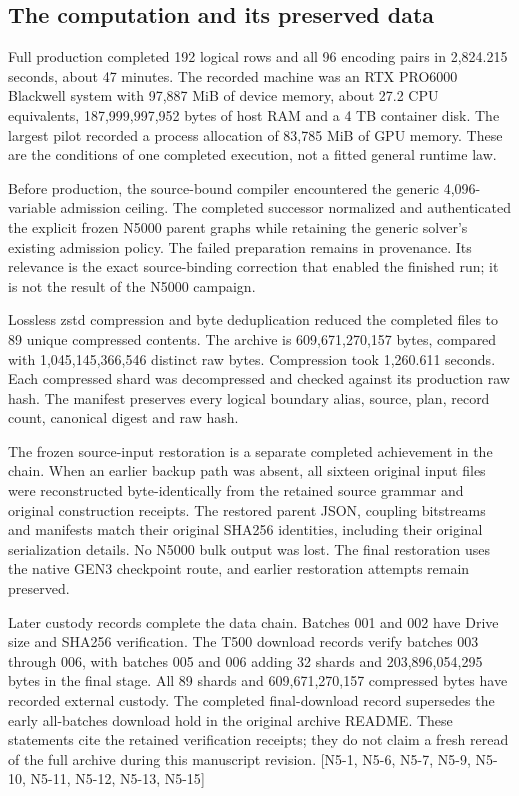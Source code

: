 \subsection{The computation and its preserved data}\label{the-computation-and-its-preserved-data}

Full production completed 192 logical rows and all 96 encoding pairs in 2,824.215 seconds, about 47 minutes. The recorded machine was an RTX PRO6000 Blackwell system with 97,887 MiB of device memory, about 27.2 CPU equivalents, 187,999,997,952 bytes of host RAM and a 4 TB container disk. The largest pilot recorded a process allocation of 83,785 MiB of GPU memory. These are the conditions of one completed execution, not a fitted general runtime law.

Before production, the source-bound compiler encountered the generic 4,096-variable admission ceiling. The completed successor normalized and authenticated the explicit frozen N5000 parent graphs while retaining the generic solver's existing admission policy. The failed preparation remains in provenance. Its relevance is the exact source-binding correction that enabled the finished run; it is not the result of the N5000 campaign.

Lossless zstd compression and byte deduplication reduced the completed files to 89 unique compressed contents. The archive is 609,671,270,157 bytes, compared with 1,045,145,366,546 distinct raw bytes. Compression took 1,260.611 seconds. Each compressed shard was decompressed and checked against its production raw hash. The manifest preserves every logical boundary alias, source, plan, record count, canonical digest and raw hash.

The frozen source-input restoration is a separate completed achievement in the chain. When an earlier backup path was absent, all sixteen original input files were reconstructed byte-identically from the retained source grammar and original construction receipts. The restored parent JSON, coupling bitstreams and manifests match their original SHA256 identities, including their original serialization details. No N5000 bulk output was lost. The final restoration uses the native GEN3 checkpoint route, and earlier restoration attempts remain preserved.

Later custody records complete the data chain. Batches 001 and 002 have Drive size and SHA256 verification. The T500 download records verify batches 003 through 006, with batches 005 and 006 adding 32 shards and 203,896,054,295 bytes in the final stage. All 89 shards and 609,671,270,157 compressed bytes have recorded external custody. The completed final-download record supersedes the early all-batches download hold in the original archive README. These statements cite the retained verification receipts; they do not claim a fresh reread of the full archive during this manuscript revision. {[}N5-1, N5-6, N5-7, N5-9, N5-10, N5-11, N5-12, N5-13, N5-15{]}

